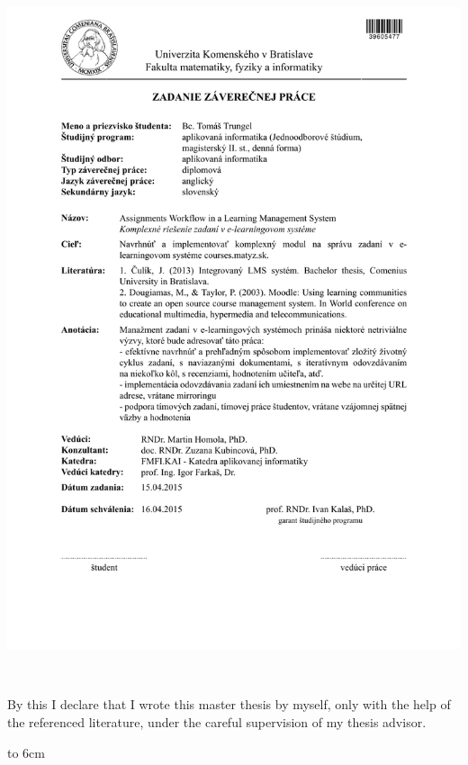 \documentclass[12pt, oneside]{book}
\begin{document}
\newpage 
\thispagestyle{empty}
\hspace{-2cm}\includegraphics[width=1.1\textwidth]{Tomas.pdf}


\newpage

\noindent
\begin{minipage}{0.25\textwidth}~\end{minipage}
\begin{minipage}{0.68\textwidth}
By this I declare that I wrote this master thesis by myself, only with the help of the referenced literature, under the careful supervision of my thesis advisor.
\bigskip\bigskip

\hfill\hbox to 6cm{\dotfill}
\end{minipage}
\vfill\eject %
~\vfill\eject %


\end{document}
